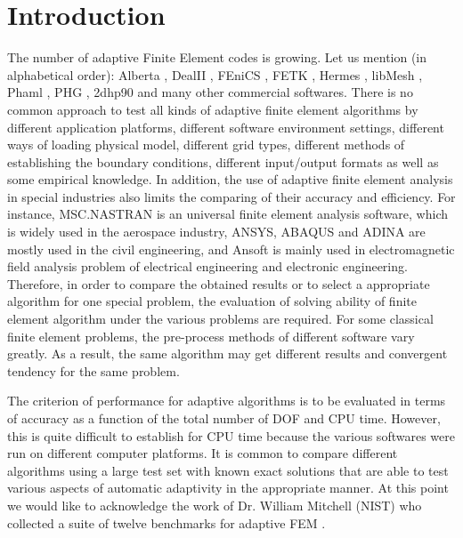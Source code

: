\section{Introduction}
\label{sec:intro}

The number of adaptive Finite Element codes is growing.
Let us mention (in alphabetical order): Alberta
\cite{alberta}, DealII \cite{dealii}, FEniCS
\cite{fenics}, FETK \cite{fetk}, Hermes \cite{hermes}, 
libMesh \cite{libmesh}, Phaml \cite{phaml}, PHG \cite{phg}, 
2dhp90 \cite{2dhp90} and many other commercial softwares.
There is no common approach to test all kinds of adaptive 
finite element algorithms by different application platforms, 
different software environment settings, 
different ways of loading physical model, different grid types, 
different methods of establishing the boundary conditions, 
different input/output formats as well as some empirical knowledge. 
In addition, the use of adaptive finite element analysis in special 
industries also limits the comparing of their accuracy and efficiency.
For instance, MSC.NASTRAN is an universal finite element analysis software, 
which is widely used in the aerospace industry, ANSYS, ABAQUS and ADINA are 
mostly used in the civil engineering, and Ansoft is mainly used in electromagnetic 
field analysis problem of electrical engineering and electronic engineering. 
Therefore, in order to compare the obtained results or to select a appropriate 
algorithm for one special problem, the evaluation of solving ability of finite 
element algorithm under the various problems are required. For some classical 
finite element problems, the pre-process methods of different software vary greatly. 
As a result, the same algorithm may get different results and convergent tendency 
for the same problem.

The criterion of performance for adaptive algorithms is to be
evaluated in terms of accuracy as a function of the total number
of DOF and CPU time. However, this is quite difficult to establish
for CPU time because the various softwares were run on different
computer platforms.
It is common to compare different algorithms using a large test set
with known exact solutions that are able to test various aspects of
automatic adaptivity in the appropriate manner. 
At this point we would like to acknowledge the work of
Dr. William Mitchell (NIST) who collected a suite of
twelve benchmarks for adaptive FEM \cite{mitchell-1}. 

